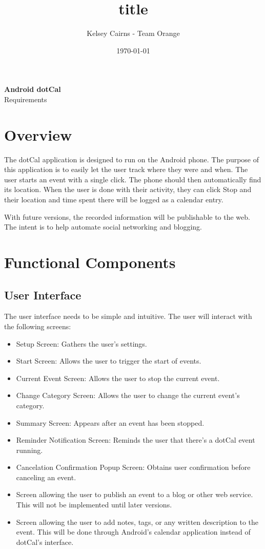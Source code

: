 \documentclass[11pt]{article}
\title{title}
\author{Kelsey Cairns - Team Orange}
\date{\today} %
\newcommand{\bt}[1]{{\sc #1}}
\begin{document}
\begin{centering}
\textbf{\huge{Android dotCal}}\\
\LARGE{Requirements}

\end{centering}

\tableofcontents

\section{Overview}

The dotCal application is designed to run on the Android phone. The purpose of this application is to easily let the user track where they were and when. The user starts an event with a single click. The phone should then automatically find its location. When the user is done with their activity, they can click \bt{Stop} and their location and time spent there will be logged as a calendar entry.

With future versions, the recorded information will be publishable to the web. The intent is to help automate social networking and blogging.

\section{Functional Components}

\subsection{User Interface}

The user interface needs to be simple and intuitive. The user will interact with the following screens:

\begin{itemize}
	\item{Setup Screen: Gathers the user's settings.}
	\item{Start Screen: Allows the user to trigger the start of events.}
	\item{Current Event Screen: Allows the user to stop the current event.}
	\item{Change Category Screen: Allows the user to change the current event's category.}
	\item{Summary Screen: Appears after an event has been stopped.}
	\item{Reminder Notification Screen: Reminds the user that there's a dotCal event running.}
	\item{Cancelation Confirmation Popup Screen: Obtains user confirmation before canceling an event.}
	\item{Screen allowing the user to publish an event to a blog or other web service. This will not be implemented until later versions.}
	\item{Screen allowing the user to add notes, tags, or any written description to the event. This will be done through Android's calendar application instead of dotCal's interface.}
\end{itemize}
\end{document}
